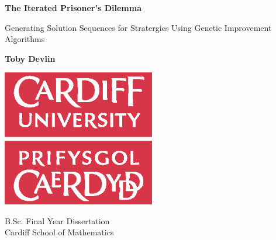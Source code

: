 \begin{titlepage}
    \begin{center}
        \vspace*{2cm}

        \textbf{The Iterated Prisoner's Dilemma}

        \vspace{0.5cm}
        Generating Solution Sequences for Stratergies Using Genetic Improvement Algorithms

        \vspace{1.5cm}

        \textbf{Toby Devlin}
        \vspace{1.5cm}

        \includegraphics[width=0.5\textwidth]{img/universitylogo.eps}

        \vfill


        B.Sc. Final Year Dissertation\\

        \vspace{0.5cm}
        Cardiff School of Mathematics

        \vspace{1.5cm}



    \end{center}
\end{titlepage}